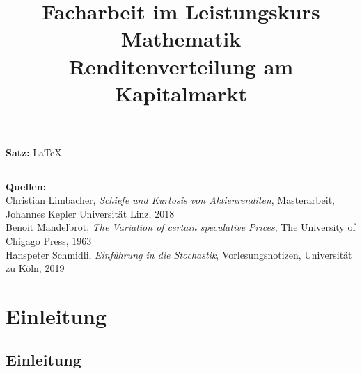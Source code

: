 \documentclass[12pt, a4paper]{report}
\title{\LARGE   Facharbeit im Leistungskurs Mathematik  \vspace*{0.5cm} \\
  \Huge Renditenverteilung am Kapitalmarkt}
\theoremstyle{definition}
\begin{document}
\maketitle
\newpage
\vspace*{\fill}
\begin{normalsize}
\noindent
  \textbf{Satz:}
  \LaTeX
\end{normalsize}
\vspace*{5pt}
\hrule
\vspace{5pt}
\noindent
\textbf{Quellen:}
\\
Christian Limbacher, \textit{Schiefe und Kurtosis von Aktienrenditen}, Masterarbeit, Johannes Kepler Universität Linz, 2018 \\
Benoit Mandelbrot, \textit{The Variation of certain speculative Prices}, The University of Chigago Press, 1963 \\
Hanspeter Schmidli, \textit{Einführung in die Stochastik}, Vorlesungsnotizen, Universität zu Köln, 2019
\tableofcontents
\newpage
\chapter{Einleitung}
\section{Einleitung}
\end{document}
